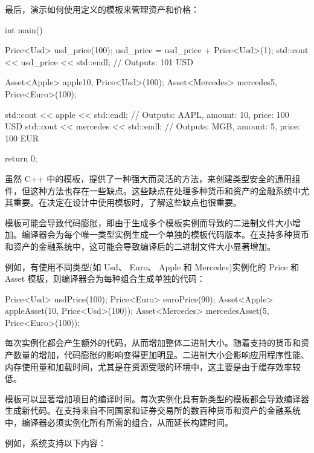 
最后，演示如何使用定义的模板来管理资产和价格：

\begin{cpp}
int main() {
    Price<Usd> usd_price(100);
    usd_price = usd_price + Price<Usd>(1);
    std::cout << usd_price << std::endl; // Outputs: 101 USD

    Asset<Apple> apple{10, Price<Usd>(100)};
    Asset<Mercedes> mercedes{5, Price<Euro>(100)};

    std::cout << apple << std::endl; // Outputs: AAPL, amount: 10, price: 100 USD
    std::cout << mercedes << std::endl; // Outputs: MGB, amount: 5, price: 100 EUR

    return 0;
}
\end{cpp}


虽然 C++ 中的模板，提供了一种强大而灵活的方法，来创建类型安全的通用组件，但这种方法也存在一些缺点。这些缺点在处理多种货币和资产的金融系统中尤其重要。在决定在设计中使用模板时，了解这些缺点也很重要。


模板可能会导致代码膨胀，即由于生成多个模板实例而导致的二进制文件大小增加。编译器会为每个唯一类型实例生成一个单独的模板代码版本。在支持多种货币和资产的金融系统中，这可能会导致编译后的二进制文件大小显著增加。

例如，有使用不同类型(如 Usd、 Euro、 Apple 和 Mercedes)实例化的 Price 和 Asset 模板，则编译器会为每种组合生成单独的代码：

\begin{cpp}
Price<Usd> usdPrice(100);
Price<Euro> euroPrice(90);
Asset<Apple> appleAsset(10, Price<Usd>(100));
Asset<Mercedes> mercedesAsset(5, Price<Euro>(100));
\end{cpp}

每次实例化都会产生额外的代码，从而增加整体二进制大小。随着支持的货币和资产数量的增加，代码膨胀的影响变得更加明显。二进制大小会影响应用程序性能、内存使用量和加载时间，尤其是在资源受限的环境中，这主要是由于缓存效率较低。


模板可以显著增加项目的编译时间。每次实例化具有新类型的模板都会导致编译器生成新代码。在支持来自不同国家和证券交易所的数百种货币和资产的金融系统中，编译器必须实例化所有所需的组合，从而延长构建时间。

例如，系统支持以下内容：

